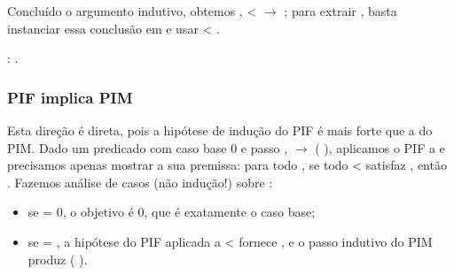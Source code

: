     Concluído o argumento indutivo, obtemos \coqdockw{\ensuremath{\forall}}  ,  <  \ensuremath{\rightarrow}  ;
    para extrair  , basta instanciar essa conclusão em   e
    usar  <  . 
\begin{coqdoccode}
\coqdocemptyline
\coqdocnoindent
{} :   .\coqdoceol
\coqdocemptyline
\end{coqdoccode}
\subsubsection{PIF implica PIM}




    Esta direção é direta, pois a hipótese de indução do PIF é mais
    forte que a do PIM. Dado um predicado  com caso base  0 e
    passo \coqdockw{\ensuremath{\forall}} ,   \ensuremath{\rightarrow}  ( ), aplicamos o PIF a  e
    precisamos apenas mostrar a sua premissa: para todo , se todo
     <  satisfaz , então  . Fazemos análise de casos
    (não indução!) sobre :



\begin{itemize}
\item  se  = 0, o objetivo é  0, que é exatamente o caso base;



\item  se  =  , a hipótese do PIF aplicada a  <   fornece
       , e o passo indutivo do PIM produz  ( ).

\end{itemize}


